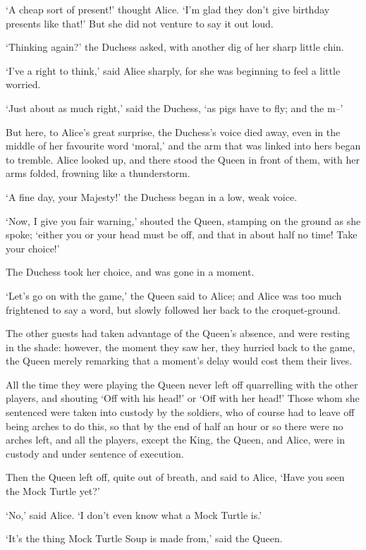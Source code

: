   `A cheap sort of present!' thought Alice.  `I'm glad they don't
give birthday presents like that!'  But she did not venture to
say it out loud.

  `Thinking again?' the Duchess asked, with another dig of her
sharp little chin.

  `I've a right to think,' said Alice sharply, for she was
beginning to feel a little worried.

  `Just about as much right,' said the Duchess, `as pigs have to fly;
and the m--'

  But here, to Alice's great surprise, the Duchess's voice died
away, even in the middle of her favourite word `moral,' and the
arm that was linked into hers began to tremble.  Alice looked up,
and there stood the Queen in front of them, with her arms folded,
frowning like a thunderstorm.

  `A fine day, your Majesty!' the Duchess began in a low, weak
voice.

  `Now, I give you fair warning,' shouted the Queen, stamping on
the ground as she spoke; `either you or your head must be off,
and that in about half no time!  Take your choice!'

  The Duchess took her choice, and was gone in a moment.

  `Let's go on with the game,' the Queen said to Alice; and Alice
was too much frightened to say a word, but slowly followed her
back to the croquet-ground.

  The other guests had taken advantage of the Queen's absence,
and were resting in the shade:  however, the moment they saw her,
they hurried back to the game, the Queen merely remarking that a
moment's delay would cost them their lives.

  All the time they were playing the Queen never left off
quarrelling with the other players, and shouting `Off with his
head!' or `Off with her head!'  Those whom she sentenced were
taken into custody by the soldiers, who of course had to leave
off being arches to do this, so that by the end of half an hour
or so there were no arches left, and all the players, except the
King, the Queen, and Alice, were in custody and under sentence of
execution.

  Then the Queen left off, quite out of breath, and said to
Alice, `Have you seen the Mock Turtle yet?'

  `No,' said Alice.  `I don't even know what a Mock Turtle is.'

  `It's the thing Mock Turtle Soup is made from,' said the Queen.


